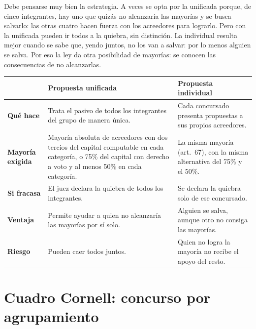 \documentclass[12pt,oneside]{book}
\begin{document}
\begin{important}
Debe pensarse muy bien la estrategia. A veces se opta por la unificada porque, de cinco integrantes, hay uno que quizás no alcanzaría las mayorías y se busca salvarlo: las otras cuatro hacen fuerza con los acreedores para lograrlo. Pero con la unificada pueden ir todos a la quiebra, sin distinción. La individual resulta mejor cuando se sabe que, yendo juntos, no los van a salvar: por lo menos alguien se salva. Por eso la ley da otra posibilidad de mayorías: se conocen las consecuencias de no alcanzarlas.
\end{important}

\begin{table}[H]
\centering
\small
\begin{tabularx}{\textwidth}{@{}>{\raggedright\arraybackslash}p{2.6cm}YY@{}}
\toprule
 & \textbf{Propuesta unificada} & \textbf{Propuesta individual} \\
\midrule
\textbf{Qué hace} & Trata el pasivo de todos los integrantes del grupo de manera única. & Cada concursado presenta propuestas a sus propios acreedores. \\
\textbf{Mayoría exigida} & Mayoría absoluta de acreedores con dos tercios del capital computable en cada categoría, o 75\% del capital con derecho a voto y al menos 50\% en cada categoría. & La misma mayoría (art.~67), con la misma alternativa del 75\% y el 50\%. \\
\textbf{Si fracasa} & El juez declara la quiebra de todos los integrantes. & Se declara la quiebra solo de ese concursado. \\
\textbf{Ventaja} & Permite ayudar a quien no alcanzaría las mayorías por sí solo. & Alguien se salva, aunque otro no consiga las mayorías. \\
\textbf{Riesgo} & Pueden caer todos juntos. & Quien no logra la mayoría no recibe el apoyo del resto. \\
\bottomrule
\end{tabularx}
\end{table}

\section{Cuadro Cornell: concurso por agrupamiento}
\end{document}
